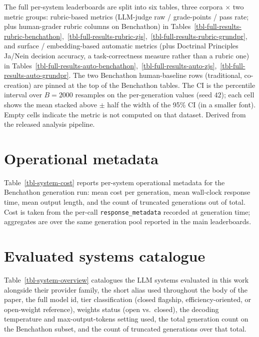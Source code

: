 \documentclass[11pt]{article}
\begin{document}
The full per-system leaderboards are split into six tables, three
corpora \(\times\) two metric groups: rubric-based metrics (LLM-judge
raw / grade-points / pass rate; plus human-grader rubric columns on
Benchathon) in
Tables~\ref{tbl-full-results-rubric-benchathon},~\ref{tbl-full-results-rubric-zjs},~\ref{tbl-full-results-rubric-grundpr},
and surface / embedding-based automatic metrics (plus Doctrinal
Principles Ja/Nein decision accuracy, a task-correctness measure rather
than a rubric one) in
Tables~\ref{tbl-full-results-auto-benchathon},~\ref{tbl-full-results-auto-zjs},~\ref{tbl-full-results-auto-grundpr}.
The two Benchathon human-baseline rows (traditional, co-creation) are
pinned at the top of the Benchathon tables. The CI is the percentile
interval over \(B=2000\) resamples on the per-generation values (seed
\(42\)); each cell shows the mean stacked above \(\pm\) half the width
of the 95\% CI (in a smaller font). Empty cells indicate the metric is
not computed on that dataset. Derived from the released analysis
pipeline.








\section{Operational metadata}\label{operational-metadata}

Table~\ref{tbl-system-cost} reports per-system operational metadata for
the Benchathon generation run: mean cost per generation, mean wall-clock
response time, mean output length, and the count of truncated
generations out of total. Cost is taken from the per-call
\texttt{response\_metadata} recorded at generation time; aggregates are
over the same generation pool reported in the main leaderboards.



\section{Evaluated systems catalogue}\label{evaluated-systems-catalogue}

Table~\ref{tbl-system-overview} catalogues the LLM systems evaluated in
this work alongside their provider family, the short alias used
throughout the body of the paper, the full model id, tier classification
(closed flagship, efficiency-oriented, or open-weight reference),
weights status (open vs.~closed), the decoding temperature and
max-output-tokens setting used, the total generation count on the
Benchathon subset, and the count of truncated generations over that
total.
\end{document}
